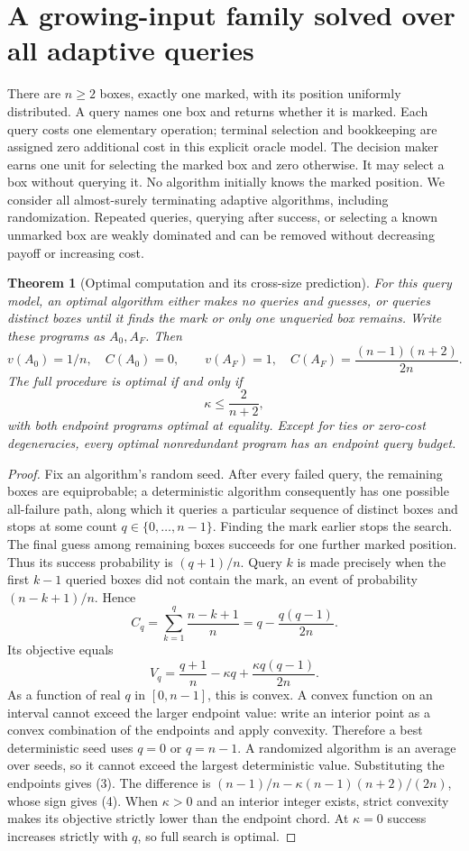 \documentclass[11pt]{article}
\newtheorem{theorem}{Theorem}
\theoremstyle{remark}
\begin{document}
\section{A growing-input family solved over all adaptive queries}
There are $n\geq2$ boxes, exactly one marked, with its position uniformly distributed. A query names one box and returns whether it is marked. Each query costs one elementary operation; terminal selection and bookkeeping are assigned zero additional cost in this explicit oracle model. The decision maker earns one unit for selecting the marked box and zero otherwise. It may select a box without querying it. No algorithm initially knows the marked position. We consider all almost-surely terminating adaptive algorithms, including randomization. Repeated queries, querying after success, or selecting a known unmarked box are weakly dominated and can be removed without decreasing payoff or increasing cost.

\begin{theorem}[Optimal computation and its cross-size prediction]
For this query model, an optimal algorithm either makes no queries and guesses, or queries distinct boxes until it finds the mark or only one unqueried box remains. Write these programs as $A_0,A_F$. Then
\[
 v(A_0)=1/n,\quad C(A_0)=0,\qquad
 v(A_F)=1,\quad C(A_F)=\frac{(n-1)(n+2)}{2n}.              \tag{3}
\]
The full procedure is optimal if and only if
\[
 \kappa\leq\frac{2}{n+2},                               \tag{4}
\]
with both endpoint programs optimal at equality. Except for ties or zero-cost degeneracies, every optimal nonredundant program has an endpoint query budget.
\end{theorem}
\begin{proof}
Fix an algorithm's random seed. After every failed query, the remaining boxes are equiprobable; a deterministic algorithm consequently has one possible all-failure path, along which it queries a particular sequence of distinct boxes and stops at some count $q\in\{0,\ldots,n-1\}$. Finding the mark earlier stops the search. The final guess among remaining boxes succeeds for one further marked position. Thus its success probability is $(q+1)/n$. Query $k$ is made precisely when the first $k-1$ queried boxes did not contain the mark, an event of probability $(n-k+1)/n$. Hence
\[
 C_q=\sum_{k=1}^q\frac{n-k+1}{n}
     =q-\frac{q(q-1)}{2n}.
\]
Its objective equals
\[
 V_q=\frac{q+1}{n}-\kappa q+\frac{\kappa q(q-1)}{2n}.
\]
As a function of real $q$ in $[0,n-1]$, this is convex. A convex function on an interval cannot exceed the larger endpoint value: write an interior point as a convex combination of the endpoints and apply convexity. Therefore a best deterministic seed uses $q=0$ or $q=n-1$. A randomized algorithm is an average over seeds, so it cannot exceed the largest deterministic value. Substituting the endpoints gives (3). The difference is
$(n-1)/n-\kappa(n-1)(n+2)/(2n)$, whose sign gives (4). When $\kappa>0$ and an interior integer exists, strict convexity makes its objective strictly lower than the endpoint chord. At $\kappa=0$ success increases strictly with $q$, so full search is optimal.
\end{proof}
\end{document}
